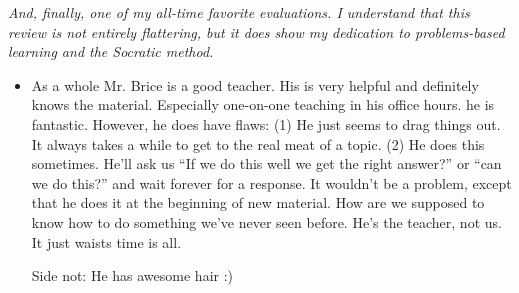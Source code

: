 \documentclass[11pt]{article}
\begin{document}
\emph{And, finally, one of my all-time favorite evaluations. I understand that this review is not entirely flattering, but it does show my dedication to problems-based learning and the Socratic method.}

	\begin{itemize}
		\item{} As a whole Mr. Brice is a good teacher. His is very helpful and definitely knows the material. Especially one-on-one teaching in  his office hours. he is fantastic. However, he does have flaws: (1) He just seems to drag things out. It always takes a while to get to the real meat of a topic. (2) He does this sometimes. He'll ask us ``If we do this well we get the right answer?'' or ``can we do this?'' and wait forever for a response. It wouldn't be a problem, except that he does it at the beginning of new material. How are we supposed to know how to do something we've never seen before. He's the teacher, not us. It just waists time is all.
		
		Side not: He has awesome hair :)
	\end{itemize}



\label{page:last}
\end{document}
